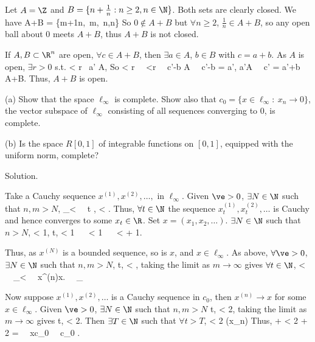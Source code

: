 Let $A=\Z$ and $B=\{n+\frac 1n:n\geq 2,n\in \N\}$. Both sets are clearly closed. We have
\be
A+B = \{m+\tfrac 1n,\ m\in \Z,\ n,n\in\N\}
\ee
So $0\notin A+B$ but $\forall n\geq 2$, $\frac 1n\in A+B$, so any open ball about 0 meets $A+B$, thus $A+B$ is not closed.

If $A,B\subset \R^n$ are open, $\forall c\in A+B$, then $\exists a\in A$, $b\in B$ with $c=a+b$. As $A$ is open, $\exists r>0$ s.t.
\be
{} < r \ra \ a' \in A, 
\ee
So 
\be
{} < r \ \ra \ <r \ \ra \ c'-b \in A \ \ra \ c'-b = a', a'\in A \ \ra \ c' = a'+b \in A+B.
\ee
Thus, $A+B$ is open.

\begin{exercise}
\ben
\item [(a)] Show that the space $\ell_\infty$ is complete. Show also that $c_0 = \{x\in \ell_\infty:\ x_n \to 0\}$, the vector subspace of $\ell_\infty$ consisting of all sequences converging to 0, is complete.
\item [(b)] Is the space $R[0, 1]$ of integrable functions on $[0, 1]$, equipped with the uniform norm, complete?
\een
\end{exercise}

Solution. \ben
\item [(a)] Take a Cauchy sequence $x^{(1)}, x^{(2)}, \dots, $ in $\ell_\infty$. Given $\ve>0$, $\exists N\in\N$ such that $n,m>N$,
\be
{}_\infty < \ve \ \ra \ \forall t \in \N, \quad {} < \ve.
\ee
Thus, $\forall t\in \N$ the sequence $x^{(1)}_t, x^{(2)}_t,\dots$ is Cauchy and hence converges to some $x_t \in \R$. Set $x=(x_1, x_2,\dots)$. $\exists N\in \N$ such that $n>N$,
\be
{} < 1, \quad {}\forall t\in\N,\quad {} < 1 \ \ra \  < 1 \ \ra\  <   + 1.
\ee

Thus, as $x^{(N)}$ is a bounded sequence, so is $x$, and $x\in \ell_\infty$. As above, $\forall \ve >0$, $\exists N\in \N$ such that $n,m>N$,
\be
\forall t\in \N,\quad {} < \ve,
\ee
taking the limit as $m\to\infty$ gives $\forall t\in \N$, 
\be
{} < \ve \ \ra \ _\infty < \ve \ \ra\ x^{(n)}\to x. \ \ra \ \ell_\infty {}
\ee

Now suppose $x^{(1)}, x^{(2)},\dots$ is a Cauchy sequence in $c_0$, then $x^{(n)}\to x$ for some $x\in \ell_\infty$. Given $\ve>0$, $\exists N\in\N$ such that $n,m>N$
\be
\forall t\in \N,\quad {} < \frac {\ve}2,
\ee
taking the limit as $m\to\infty$ gives 
\be
\forall t\in \N,\quad {} < \frac {\ve}2.
\ee
Then $\exists T\in\N$ such that $\forall t>T$,
\be
{} < \frac{\ve}2 \quad\quad (x_n)
\ee
Thus,
\be
{} \leq {} +  < \frac {\ve}2 + \frac {\ve}2 = \ve \ \ra \ x\in c_0 \ \ra \ c_0 .
\ee

